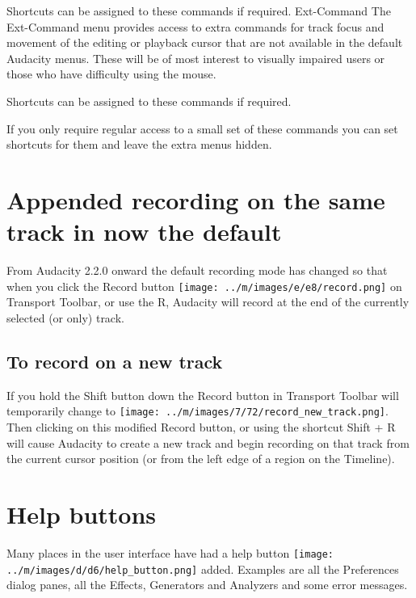 \documentclass[twocolumn]{book}
\begin{document}
Shortcuts can be assigned to these commands if required.
Ext-Command
The Ext-Command menu provides access to extra commands for track focus and movement of the editing or playback cursor that are not available in the default Audacity menus. These will be of most interest to visually impaired users or those who have difficulty using the mouse.

Shortcuts can be assigned to these commands if required.

If you only require regular access to a small set of these commands you can set shortcuts for them and leave the extra menus hidden.



\section{Appended recording on the same track in now the default}


From Audacity 2.2.0 onward the default recording mode has changed so that when you click the Record button \texttt{[image: ../m/images/e/e8/record.png]} on Transport Toolbar, or use the R, Audacity will record at the end of the currently selected (or only) track.

\subsection{To record on a new track}


If you hold the Shift button down the Record button in Transport Toolbar will temporarily change to \texttt{[image: ../m/images/7/72/record\_new\_track.png]}. Then clicking on this modified Record button, or using the shortcut Shift + R will cause Audacity to create a new track and begin recording on that track from the current cursor position (or from the left edge of a region on the Timeline). 



\section{Help buttons}


Many places in the user interface have had a help button \texttt{[image: ../m/images/d/d6/help\_button.png]} added. Examples are all the Preferences dialog panes, all the Effects, Generators and Analyzers and some error messages.
\end{document}
